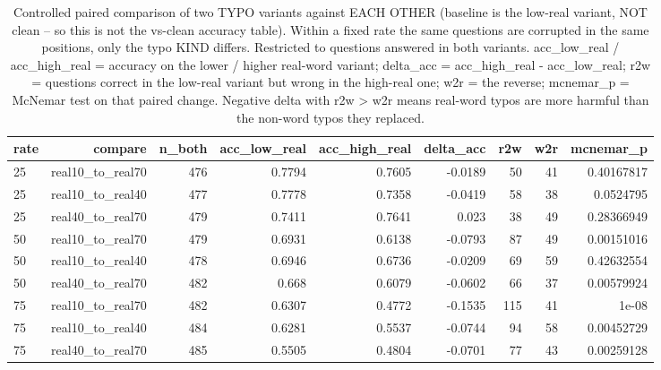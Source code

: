 \documentclass[11pt]{article}
\begin{document}
\begin{table}[H]
\centering
\caption{Controlled paired comparison of two TYPO variants against EACH OTHER (baseline is the low-real variant, NOT clean -- so this is not the vs-clean accuracy table). Within a fixed rate the same questions are corrupted in the same positions, only the typo KIND differs. Restricted to questions answered in both variants. acc\_low\_real / acc\_high\_real = accuracy on the lower / higher real-word variant; delta\_acc = acc\_high\_real - acc\_low\_real; r2w = questions correct in the low-real variant but wrong in the high-real one; w2r = the reverse; mcnemar\_p = McNemar test on that paired change. Negative delta with r2w > w2r means real-word typos are more harmful than the non-word typos they replaced.}
\small
\begin{adjustbox}{max width=\textwidth}
\begin{tabular}{lrrrrrrrr}
\toprule
\textbf{rate} & \textbf{compare} & \textbf{n\_both} & \textbf{acc\_low\_real} & \textbf{acc\_high\_real} & \textbf{delta\_acc} & \textbf{r2w} & \textbf{w2r} & \textbf{mcnemar\_p} \\
\midrule
25 & real10\_to\_real70 & 476 & 0.7794 & 0.7605 & -0.0189 & 50 & 41 & 0.40167817 \\
25 & real10\_to\_real40 & 477 & 0.7778 & 0.7358 & -0.0419 & 58 & 38 & 0.0524795 \\
25 & real40\_to\_real70 & 479 & 0.7411 & 0.7641 & 0.023 & 38 & 49 & 0.28366949 \\
50 & real10\_to\_real70 & 479 & 0.6931 & 0.6138 & -0.0793 & 87 & 49 & 0.00151016 \\
50 & real10\_to\_real40 & 478 & 0.6946 & 0.6736 & -0.0209 & 69 & 59 & 0.42632554 \\
50 & real40\_to\_real70 & 482 & 0.668 & 0.6079 & -0.0602 & 66 & 37 & 0.00579924 \\
75 & real10\_to\_real70 & 482 & 0.6307 & 0.4772 & -0.1535 & 115 & 41 & 1e-08 \\
75 & real10\_to\_real40 & 484 & 0.6281 & 0.5537 & -0.0744 & 94 & 58 & 0.00452729 \\
75 & real40\_to\_real70 & 485 & 0.5505 & 0.4804 & -0.0701 & 77 & 43 & 0.00259128 \\
\bottomrule
\end{tabular}
\end{adjustbox}
\end{table}
\end{document}
